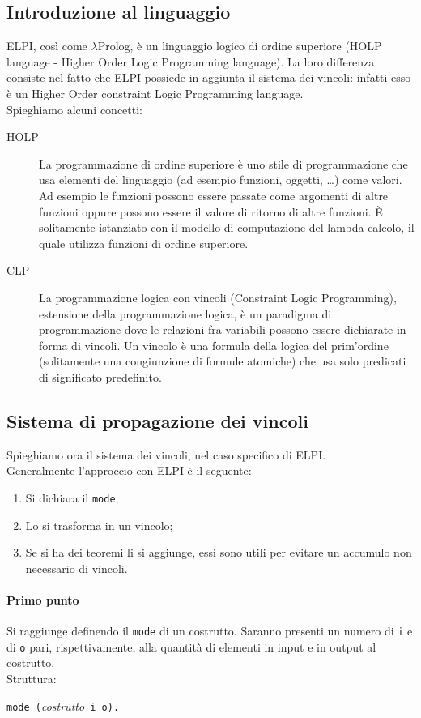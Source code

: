 \documentclass[12pt,a4paper,openright,twoside]{report}
\begin{document}
\subsection{Introduzione al linguaggio}
ELPI, così come $\lambda$Prolog, è un linguaggio logico di ordine superiore (HOLP language - Higher Order Logic Programming language). La loro differenza consiste nel fatto che ELPI possiede in aggiunta il sistema dei vincoli: infatti esso è un Higher Order constraint Logic Programming language.\\
Spieghiamo alcuni concetti:
\begin{description}
 \item[HOLP] La programmazione di ordine superiore è uno stile di programmazione che usa elementi del linguaggio (ad esempio funzioni, oggetti, \ldots) come valori. Ad esempio le funzioni possono essere passate come argomenti di altre funzioni oppure possono essere il valore di ritorno di altre funzioni. È solitamente istanziato con il modello di computazione del lambda calcolo, il quale utilizza funzioni di ordine superiore.
 \item[CLP] La programmazione logica con vincoli (Constraint Logic Programming), estensione della programmazione logica, è un paradigma di programmazione dove le relazioni fra variabili possono essere dichiarate in forma di vincoli. Un vincolo è una formula della logica del prim'ordine (solitamente una congiunzione di formule atomiche) che usa solo predicati di significato predefinito.
\end{description}

\subsection{Sistema di propagazione dei vincoli}
Spieghiamo ora il sistema dei vincoli, nel caso specifico di ELPI.\\
Generalmente l'approccio con ELPI è il seguente:
\begin{enumerate}
 \item Si dichiara il \verb"mode";
 \item Lo si trasforma in un vincolo;
 \item Se si ha dei teoremi li si aggiunge, essi sono utili per evitare un accumulo non necessario di vincoli.
\end{enumerate}

\paragraph{Primo punto}
Si raggiunge definendo il \verb"mode" di un costrutto. Saranno presenti un numero di \verb"i" e di \verb"o" pari, rispettivamente, alla quantità di elementi in input e in output al costrutto.\\
Struttura:
\begin{center}
\verb"mode ("\textit{costrutto}\verb" i o)."
\end{center}
\end{document}
